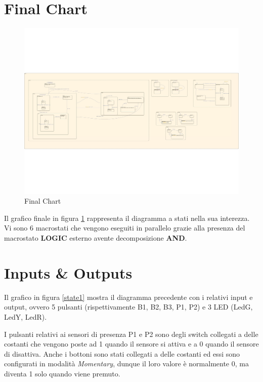     \section{Final Chart}
        \begin{figure}[H]
            \centering
            \includegraphics[width=1.5\linewidth, angle=90]{figures/final.jpg}
            \caption{Final Chart}
            \label{final}
        \end{figure}

        Il grafico finale in figura \ref{final} rappresenta il diagramma a stati nella sua interezza. Vi sono 6 macrostati che vengono eseguiti in parallelo grazie alla presenza del macrostato \textbf{LOGIC} esterno avente decomposizione \textbf{AND}.


    \section{Inputs \& Outputs}
        Il grafico in figura \ref{state1} mostra il diagramma precedente con i relativi input e output, ovvero 5 pulsanti (rispettivamente B1, B2, B3, P1, P2) e 3 LED (LedG, LedY, LedR).
        
        \noindent I pulsanti relativi ai sensori di presenza P1 e P2 sono degli switch collegati a delle costanti che vengono poste ad 1 quando il sensore si attiva e a 0 quando il sensore di disattiva.
        Anche i bottoni sono stati collegati a delle costanti ed essi sono configurati in modalità \textit{Momentary}, dunque il loro valore è normalmente 0, ma diventa 1 solo quando viene premuto.
    
